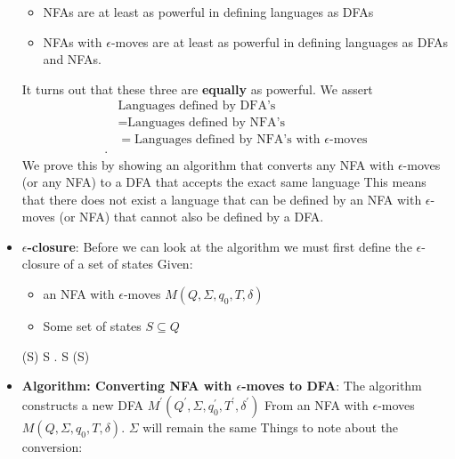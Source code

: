\documentclass{report}
\begin{document}
\begin{itemize}
\begin{itemize}
                \item NFAs are at least as powerful in defining languages as DFAs
                \item NFAs with $\epsilon$-moves are at least as powerful in defining languages as DFAs and NFAs.
            \end{itemize}
            \bigbreak \noindent 
            It turns out that these three are \textbf{equally} as powerful. We assert
            \begin{align*}
                &\text{Languages defined by DFA's} \\
                &=\text{Languages defined by NFA's} \\
                &=\text{Languages defined by NFA's with $\epsilon$-moves} \\
            .\end{align*}
            We prove this by showing an algorithm that converts any NFA with $\epsilon$-moves (or any NFA) to a DFA that accepts the exact same language
            \bigbreak \noindent 
            This means that there does not exist a language that can be defined by an NFA with $\epsilon$-moves (or NFA) that cannot also be defined by a DFA.
        \item \textbf{$\epsilon$-closure}: Before we can look at the algorithm we must first define the $\epsilon$-closure of a set of states 
            \bigbreak \noindent 
            Given:
            \begin{itemize}
                \item an NFA with $\epsilon$-moves $M(Q, \Sigma, q_{0}, T, \delta) $
                \item Some set of states $S \subseteq Q$
            \end{itemize}
            \bigbreak \noindent 
             \varepsilon{}(S)  S  \varepsilon{} \delta.
            \bigbreak \noindent 
             S \subseteq \varepsilon{}(S)
        \item \textbf{Algorithm: Converting NFA with $\epsilon$-moves to DFA}: The algorithm constructs a new DFA $M^{\prime}(Q^{\prime}, \Sigma, q_{0}^{\prime}, T^{\prime}, \delta^{\prime}) $ From an NFA with $\epsilon$-moves $M(Q, \Sigma, q_{0}, T, \delta) $. $\Sigma$ will remain the same
            \bigbreak \noindent 
            Things to note about the conversion:

\end{itemize}
\end{document}
